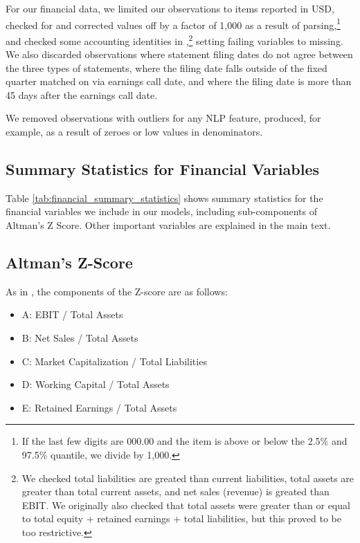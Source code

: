 \documentclass{article}[11pt]
\begin{document}
    For our financial data, we limited our observations to items reported in USD, checked for and corrected values off by a factor of 1,000 as a result of parsing,\footnote{If the last few digits are 000.00 and the item is above or below the 2.5\% and 97.5\% quantile, we divide by 1,000.} and checked some accounting identities in \cite{das_credit_2023},\footnote{We checked total liabilities are greated than current liabilities, total assets are greater than total current assets, and net sales (revenue) is greated than EBIT. We originally also checked that total assets were greater than or equal to total equity + retained earnings + total liabilities, but this proved to be too restrictive.} setting failing variables to missing. We also discarded observations where statement filing dates do not agree between the three types of statements, where the filing date falls outside of the fixed quarter matched on via earnings call date, and where the filing date is more than 45 days after the earnings call date.

    We removed observations with outliers for any NLP feature, produced, for example, as a result of zeroes or low values in denominators.

    \clearpage
    \newpage

    \subsection{Summary Statistics for Financial Variables}

    Table \ref{tab:financial_summary_statistics} shows summary statistics for the financial variables we include in our models, including sub-components of Altman's Z Score. Other important variables are explained in the main text.

    

    \clearpage
    \newpage

    \subsection{Altman's Z-Score}

    \label{sec:altman-z-score}

    As in \cite{das_credit_2023}, the components of the Z-score are as follows:

    \begin{itemize}
        \item A: EBIT / Total Assets
        \item B: Net Sales / Total Assets
        \item C: Market Capitalization / Total Liabilities
        \item D: Working Capital / Total Assets
        \item E: Retained Earnings / Total Assets
    \end{itemize}
\end{document}
